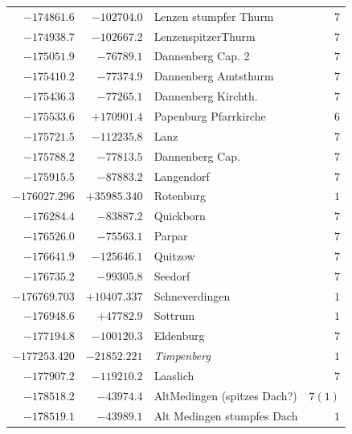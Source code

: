 \begin{center}
\begin{tabular}{r|r|p{170pt}|r}
\(-174861.6\)&\(-102704.0\)&Lenzen stumpfer Thurm&\(7\)\\
\(-174938.7\)&\(-102667.2\)&LenzenspitzerThurm&\(7\)\\
\(-175051.9\)&\(-76789.1\)&Dannenberg Cap. 2&\(7\)\\
\(-175410.2\)&\(-77374.9\)&Dannenberg Amtsthurm&\(7\)\\
\(-175436.3\)&\(-77265.1\)&Dannenberg Kirchth.&\(7\)\\
\(-175533.6\)&\(+170901.4\)&Papenburg Pfarrkirche&\(6\)\\
\(-175721.5\)&\(-112235.8\)&Lanz&\(7\)\\
\(-175788.2\)&\(-77813.5\)&Dannenberg Cap.&\(7\)\\
\(-175915.5\)&\(-87883.2\)&Langendorf&\(7\)\\
\(-176027.296\)&\(+35985.340\)&Rotenburg&\(1\)\\
\(-176284.4\)&\(-83887.2\)&Quickborn&\(7\)\\
\(-176526.0\)&\(-75563.1\)&Parpar&\(7\)\\
\(-176641.9\)&\(-125646.1\)&Quitzow&\(7\)\\
\(-176735.2\)&\(-99305.8\)&Seedorf&\(7\)\\
\(-176769.703\)&\(+10407.337\)&Schneverdingen&\(1\)\\
\(-176948.6\)&\(+47782.9\)&Sottrum&\(1\)\\
\(-177194.8\)&\(-100120.3\)&Eldenburg&\(7\)\\
\(-177253.420\)&\(-21852.221\)&\textit{Timpenberg}&\(1\)\\
\(-177907.2\)&\(-119210.2\)&Laaslich&\(7\)\\
\(-178518.2\)&\(-43974.4\)&AltMedingen (spitzes Dach?)&\(7 (1)\)\\
\(-178519.1\)&\(-43989.1\)&Alt Medingen stumpfes Dach&\(1\)\\
\hline\end{tabular}\endgroup\end{center}

